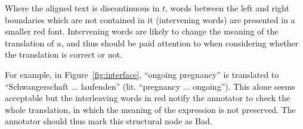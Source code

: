 \documentclass[11pt,letterpaper]{article}
\newcommand{\figref}[1]{Figure~\ref{#1}}
\newcommand{\bh}[1]{}
\begin{document}
Where the aligned text is discontinuous in $t$, words between the left
and right boundaries which are not contained in it (intervening words)
are presented in a smaller red font. 
Intervening words are likely to change the meaning of the translation
of $u$, and thus should be paid attention to when considering whether the translation
is correct or not. 

For example, 
in \figref{fig:interface}, ``ongoing pregnancy'' is translated to
``Schwangerschaft ... laufenden'' (lit. ``pregnancy ... ongoing''). This alone
seems acceptable but the interleaving words in red notify the annotator to check
the whole translation, in which the meaning of the expression is not preserved.
The annotator should thus mark this structural node as Bad.



\end{document}
